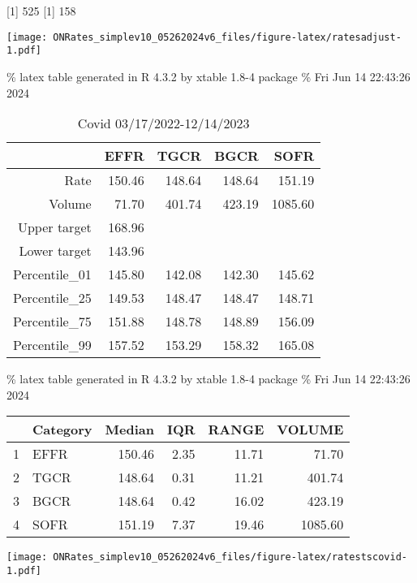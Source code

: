 \documentclass[
]{article}
\let\origfigure\figure
\let\endorigfigure\endfigure
\renewenvironment{figure}[1][2] {
    \expandafter\origfigure\expandafter[H]
} {
    \endorigfigure
}
\begin{document}
{[}1{]} 525
{[}1{]} 158

\begin{figure}
\centering
\texttt{[image: ONRates\_simplev10\_05262024v6\_files/figure-latex/ratesadjust-1.pdf]}
\caption{\label{fig:ratesadjust}EFFR during adjustment period 8/1/2019-10/31/2019}
\end{figure}

\% latex table generated in R 4.3.2 by xtable 1.8-4 package
\% Fri Jun 14 22:43:26 2024

\begin{table}[ht]
\centering
\begin{tabular}{rrrrr}
  \hline
 & EFFR & TGCR & BGCR & SOFR \\ 
  \hline
Rate & 150.46 & 148.64 & 148.64 & 151.19 \\ 
  Volume & 71.70 & 401.74 & 423.19 & 1085.60 \\ 
  Upper target & 168.96 &  &  &  \\ 
  Lower target & 143.96 &  &  &  \\ 
  Percentile\_01 & 145.80 & 142.08 & 142.30 & 145.62 \\ 
  Percentile\_25 & 149.53 & 148.47 & 148.47 & 148.71 \\ 
  Percentile\_75 & 151.88 & 148.78 & 148.89 & 156.09 \\ 
  Percentile\_99 & 157.52 & 153.29 & 158.32 & 165.08 \\ 
   \hline
\end{tabular}
\caption{Covid 03/17/2022-12/14/2023} 
\end{table}

\% latex table generated in R 4.3.2 by xtable 1.8-4 package
\% Fri Jun 14 22:43:26 2024

\begin{table}[ht]
\centering
\begin{tabular}{rlrrrr}
  \hline
 & Category & Median & IQR & RANGE & VOLUME \\ 
  \hline
1 & EFFR & 150.46 & 2.35 & 11.71 & 71.70 \\ 
  2 & TGCR & 148.64 & 0.31 & 11.21 & 401.74 \\ 
  3 & BGCR & 148.64 & 0.42 & 16.02 & 423.19 \\ 
  4 & SOFR & 151.19 & 7.37 & 19.46 & 1085.60 \\ 
   \hline
\end{tabular}
\end{table}

\begin{figure}
\centering
\texttt{[image: ONRates\_simplev10\_05262024v6\_files/figure-latex/ratestscovid-1.pdf]}
\caption{\label{fig:ratestscovid}Rates during covid 11/1/2019-3/16/2020}
\end{figure}
\end{document}
